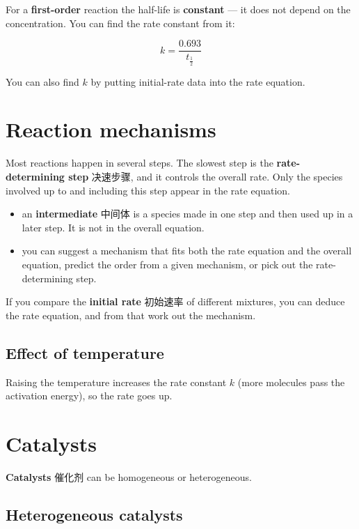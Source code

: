 \documentclass[11pt]{article}
\begin{document}
For a \textbf{first-order} reaction the half-life is \textbf{constant} — it does not depend on the concentration. You can find the rate constant from it:

\[
k = \frac{0.693}{t_{\frac{1}{2}}}
\]

You can also find $k$ by putting initial-rate data into the rate equation.

\section*{Reaction mechanisms}

Most reactions happen in several steps. The slowest step is the \textbf{rate-determining step} 决速步骤, and it controls the overall rate. Only the species involved up to and including this step appear in the rate equation.

\begin{itemize}
\item an \textbf{intermediate} 中间体 is a species made in one step and then used up in a later step. It is not in the overall equation.

\item you can suggest a mechanism that fits both the rate equation and the overall equation, predict the order from a given mechanism, or pick out the rate-determining step.

\end{itemize}

If you compare the \textbf{initial rate} 初始速率 of different mixtures, you can deduce the rate equation, and from that work out the mechanism.

\subsection*{Effect of temperature}

Raising the temperature increases the rate constant $k$ (more molecules pass the activation energy), so the rate goes up.

\section*{Catalysts}

\textbf{Catalysts} 催化剂 can be homogeneous or heterogeneous.

\subsection*{Heterogeneous catalysts}
\end{document}
